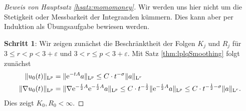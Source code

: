 \begin{proof}[Beweis von Hauptsatz \ref{hsatz:momomoney}]
  Wir werden uns hier nicht um die Stetigkeit oder Messbarkeit der Integranden kümmern. Dies kann aber per Induktion als Übungsaufgabe bewiesen werden.

  \textbf{Schritt 1}: Wir zeigen zunächst die  Beschränktheit der Folgen $K_j$ und $R_j$ für $3 \leq r < p < 3 + \varepsilon$ und $3 < r \leq p < 3 + \varepsilon$.
  Mit Satz \ref{thm:lplqSmoothing} folgt zunächst
  \begin{align*}
    \|u_0(t) \|_{\mathrm{L}^p} &= \|\mathrm{e}^{-t A} a \|_{\mathrm{L}^p} \leq C \cdot t^{-\sigma} \|a\|_{\mathrm{L}^r} \\
    \|\nabla u_0(t) \|_{\mathrm{L}^p} &= \|\nabla \mathrm{e}^{-\frac{t}{2} A} \mathrm{e}^{-\frac{t}{2} A} a \|_{\mathrm{L}^p} \leq C\cdot t^{-\frac{1}{2}} \|\mathrm{e}^{-\frac{t}{2} A} a \|_{\mathrm{L}^p} \leq C\cdot t^{-\frac{1}{2}   - \sigma} \|a\|_{\mathrm{L}^r}.
  \end{align*}
  Dies zeigt $K_0, R_0 < \infty$.


\end{proof}
